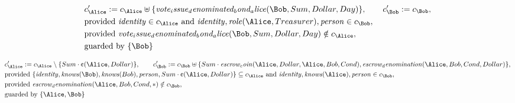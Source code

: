 \begin{align*}
&
c'_
{
\Alice
}
 := 
c_
{
\Alice
}
 \uplus 
\{
\mathit{
vote_issue_denominated_bond_alice
}
(
\Bob
,
Sum
,
Dollar
,
Day
)
\}
, \qquad 
c'_
{
\Bob
}
 := 
c_
{
\Bob
}
,\\
&
\text{provided } 
\mathit{
identity
}
 \in c_
{
\Alice
}
 \text{ and } 
\mathit{
identity
}
,
\mathit{
role
}
(
\Alice
,
Treasurer
)
,
\mathit{
person
}
 \in c_
{
\Bob
}
,\\
&
\text{provided } 
\mathit{
vote_issue_denominated_bond_alice
}
(
\Bob
,
Sum
,
Dollar
,
Day
)
 \notin c_
{
\Alice
}
,\\
&
\text{guarded by } \{
\Bob
\}
\end{align*}

\begin{align*}
&
c'_
{
\Alice
}
 := 
c_
{
\Alice
}
 \setminus 
\{
Sum
\cdot
\text{\textcent}
(
\Alice
,
Dollar
)
\}
, \qquad 
c'_
{
\Bob
}
 := 
c_
{
\Bob
}
 \uplus 
\{
Sum
\cdot
\mathit{
escrow_coin
}
(
\Alice
,
Dollar
,
\Alice
,
Bob
,
Cond
)
,
\mathit{
escrow_denomination
}
(
\Alice
,
Bob
,
Cond
,
Dollar
)
\}
,\\
&
\text{provided } 
\{
\mathit{
identity
}
,
\mathit{
knows
}
(
\Bob
)
,
\mathit{
knows
}
(
Bob
)
,
\mathit{
person
}
,
Sum
\cdot
\text{\textcent}
(
\Alice
,
Dollar
)
\}
 \subseteq c_
{
\Alice
}
 \text{ and } 
\mathit{
identity
}
,
\mathit{
knows
}
(
\Alice
)
,
\mathit{
person
}
 \in c_
{
\Bob
}
,\\
&
\text{provided } 
\mathit{
escrow_denomination
}
(
\Alice
,
Bob
,
Cond
,
\ast
)
 \notin c_
{
\Bob
}
,\\
&
\text{guarded by } \{
\Alice
,
\Bob
\}
\end{align*}

